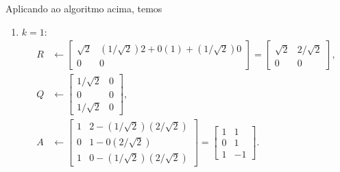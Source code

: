 \begin{questions}
\begin{parts}
\begin{solution}
            Aplicando ao algoritmo acima, temos
            \begin{enumerate}
                \item $k = 1$:
                    \begin{align*}
                        R &\leftarrow \begin{bmatrix}
                            \sqrt{2} & \left( 1 / \sqrt{2} \right) 2 + 0 \left( 1 \right) + \left( 1 / \sqrt{2} \right) 0 \\
                            0 & 0
                        \end{bmatrix} = \begin{bmatrix}
                            \sqrt{2} & 2 / \sqrt{2} \\
                            0 & 0
                        \end{bmatrix}, \\
                        Q &\leftarrow \begin{bmatrix}
                            1 / \sqrt{2} & 0 \\
                            0 & 0 \\
                            1 / \sqrt{2} & 0
                        \end{bmatrix}, \\
                        A &\leftarrow \begin{bmatrix}
                            1 & 2 - \left( 1 / \sqrt{2} \right) \left( 2 / \sqrt{2} \right) \\
                            0 & 1 - 0 \left( 2 / \sqrt{2} \right) \\
                            1 & 0 - \left( 1 / \sqrt{2} \right) \left( 2 / \sqrt{2} \right)
                        \end{bmatrix} = \begin{bmatrix}
                            1 & 1 \\
                            0 & 1 \\
                            1 & -1
                        \end{bmatrix}.
                    \end{align*}


\end{enumerate}
\end{solution}
\end{parts}
\end{questions}
